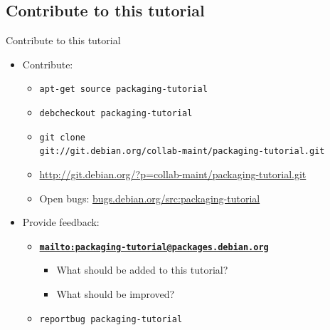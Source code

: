 \documentclass[10pt,final]{beamer}
\begin{document}
\subsection{Contribute to this tutorial}
\begin{frame}{Contribute to this tutorial}
	\begin{itemize}
		\item Contribute:
			\begin{itemize}
				\item {\small \texttt{apt-get source packaging-tutorial}}
					\hbr
				\item  {\small \texttt{debcheckout packaging-tutorial}}
					\hbr
				\item  {\small \texttt{git clone\\ git://git.debian.org/collab-maint/packaging-tutorial.git}}
					\hbr
				\item {\small \url{http://git.debian.org/?p=collab-maint/packaging-tutorial.git}}
					\hbr
				\item {\small Open bugs: \url{bugs.debian.org/src:packaging-tutorial}}
			\end{itemize}
			\br
		\item Provide feedback:
			\begin{itemize}
				\item \href{mailto:packaging-tutorial@packages.debian.org}{\textbf{\texttt{mailto:packaging-tutorial@packages.debian.org}}}
				\begin{itemize}
					\item {\small What should be added to this tutorial?}
				\item {\small What should be improved?}
				\end{itemize}
					\hbr
				\item {\small \texttt{reportbug packaging-tutorial}}
			\end{itemize}
	\end{itemize}
\end{frame}
\end{document}

